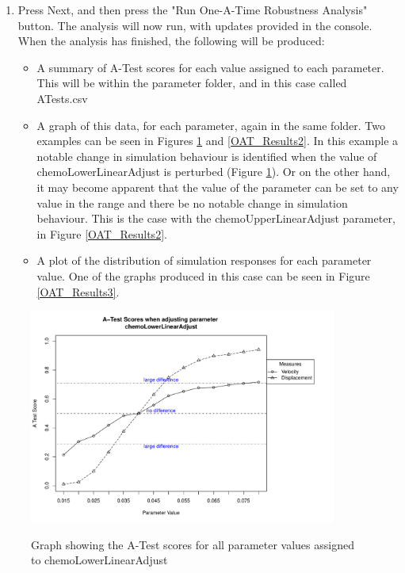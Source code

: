 \documentclass[a4paper,11pt]{article}
\begin{document}
\begin{enumerate}
\item Press Next, and then press the "Run One-A-Time Robustness Analysis" button. The analysis will now run, with updates provided in the console. When the analysis has finished, the following will be produced:
\begin{itemize}
\item A summary of A-Test scores for each value assigned to each parameter. This will be within the parameter folder, and in this case called ATests.csv
\item A graph of this data, for each parameter, again in the same folder. Two examples can be seen in Figures \ref{OAT_Results1} and \ref{OAT_Results2}. In this example a notable change in simulation behaviour is identified when the value of chemoLowerLinearAdjust is perturbed (Figure \ref{OAT_Results1}). Or on the other hand, it may become apparent that the value of the parameter can be set to any value in the range and there be no notable change in simulation behaviour. This is the case with the chemoUpperLinearAdjust parameter, in Figure \ref{OAT_Results2}.
\item A plot of the distribution of simulation responses for each parameter value. One of the graphs produced in this case can be seen in Figure \ref{OAT_Results3}.
\end{itemize}


\end{enumerate}
\newpage 
\begin{figure}[h!]
\centering
    \includegraphics[width=0.9\textwidth]{OAT_chemoLowerLinearAdjust.pdf}\\ \noindent
    \caption{Graph showing the A-Test scores for all parameter values assigned to chemoLowerLinearAdjust}
    \label{OAT_Results1}
    \end{figure}
\end{document}
